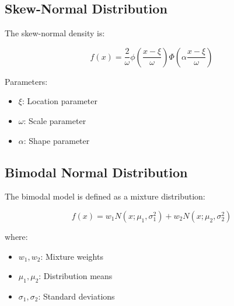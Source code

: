 \documentclass[11pt,a4paper]{article}
\begin{document}
\subsection{Skew-Normal Distribution}



The skew-normal density is:


\begin{equation}

f(x)=
\frac{2}{\omega}
\phi
\left(
\frac{x-\xi}{\omega}
\right)
\Phi
\left(
\alpha
\frac{x-\xi}{\omega}
\right)

\end{equation}



Parameters:


\begin{itemize}

\item $\xi$: Location parameter

\item $\omega$: Scale parameter

\item $\alpha$: Shape parameter

\end{itemize}




\subsection{Bimodal Normal Distribution}



The bimodal model is defined as a mixture distribution:


\begin{equation}

f(x)=
w_1
N(x;\mu_1,\sigma_1^2)
+
w_2
N(x;\mu_2,\sigma_2^2)

\end{equation}



where:


\begin{itemize}

\item $w_1,w_2$: Mixture weights

\item $\mu_1,\mu_2$: Distribution means

\item $\sigma_1,\sigma_2$: Standard deviations

\end{itemize}
\end{document}
